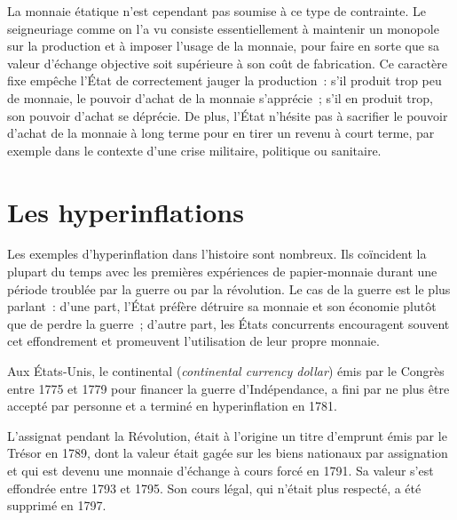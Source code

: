 \documentclass[a4paper,notitlepage]{article}
\newcommand{\eng}[1]{{\NoAutoSpaceBeforeFDP\emph{#1}}}  %
\newcommand{\sfootnote}{\,\footnote}
\begin{document}
La monnaie étatique n'est cependant pas soumise à ce type de contrainte. Le seigneuriage comme on l'a vu consiste essentiellement à maintenir un monopole sur la production et à imposer l'usage de la monnaie, pour faire en sorte que sa valeur d'échange objective soit supérieure à son coût de fabrication. Ce caractère fixe empêche l'État de correctement jauger la production~: s'il produit trop peu de monnaie, le pouvoir d'achat de la monnaie s'apprécie~; s'il en produit trop, son pouvoir d'achat se déprécie. De plus, l'État n'hésite pas à sacrifier le pouvoir d'achat de la monnaie à long terme pour en tirer un revenu à court terme, par exemple dans le contexte d'une crise militaire, politique ou sanitaire.

\section{Les hyperinflations}

Les exemples d'hyperinflation dans l'histoire sont nombreux. Ils coïncident la plupart du temps avec les premières expériences de papier-monnaie durant une période troublée par la guerre ou par la révolution. Le cas de la guerre est le plus parlant~: d'une part, l'État préfère détruire sa monnaie et son économie plutôt que de perdre la guerre~; d'autre part, les États concurrents encouragent souvent cet effondrement et promeuvent l'utilisation de leur propre monnaie.

Aux États-Unis, le continental (\eng{continental currency dollar}) émis par le Congrès entre 1775 et 1779 pour financer la guerre d'Indépendance, a fini par ne plus être accepté par personne et a terminé en hyperinflation en 1781. %

L'assignat pendant la Révolution, était à l'origine un titre d'emprunt émis par le Trésor en 1789, dont la valeur était gagée sur les biens nationaux par assignation et qui est devenu une monnaie d'échange à cours forcé en 1791. Sa valeur s'est effondrée entre 1793 et 1795. Son cours légal, qui n'était plus respecté, a été supprimé en 1797.
\end{document}
